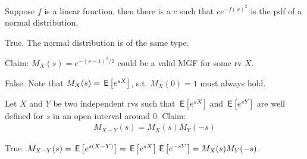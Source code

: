 \documentclass[tf-tutorial-all.tex]{subfiles}
\begin{document}
\begin{truefalse}
Suppose $f$ is a linear function, then there is a $c$ such that $c
e^{-f(x)^2}$ is the pdf of a normal distribution.
\begin{solution}
  True. The normal distribution is of the same type.
\end{solution}
\end{truefalse}


\begin{truefalse}
Claim: $M_X(s)=e^{-(s-1)^2/2}$ could be a valid MGF for some rv $X$.
\begin{solution}
False. Note that $M_X(s)=\,\mathsf{E}\left[e^{sX}\right]$, s.t. $M_X(0)=1$ must always hold.
\end{solution}
\end{truefalse}


\begin{truefalse}
Let $X$ and $Y$ be two independent rvs such that $\,\mathsf{E}\left[e^{s X}\right]$ and $\,\mathsf{E}\left[e^{s Y}\right]$ are well defined for $s$ in an open interval around $0$.
Claim:
\begin{align}
\label{eq:2}
M_{X-Y}(s)=M_X(s)M_Y(-s)
\end{align}
\begin{solution}
True. $M_{X-Y}(s)=\,\mathsf{E}\left[e^{s(X-Y)}\right]=\,\mathsf{E}\left[e^{sX}\right]\,\mathsf{E}\left[e^{-sY}\right]=M_X(s)M_Y(-s)$.
\end{solution}
\end{truefalse}


\end{document}
